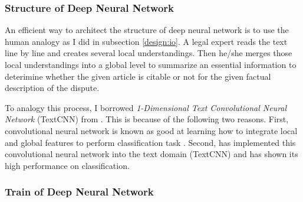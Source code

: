 \documentclass[12pt,letterpaper]{article}
\begin{document}
 

\subsubsection{Structure of Deep Neural Network}

An efficient way to architect the structure of deep neural network is to use the
human analogy as I did in subsection \ref{design:io}.
A legal expert reads the text line by line and creates several local understandings.
Then he/she merges those local understandings into a global level to summarize
an essential information to deterimine whether 
the given article is citable or not for the given factual description of the dispute. 

To analogy this process, I borrowed \textit{1-Dimensional Text Convolutional Neural Network} (TextCNN) from \cite{textcnn}.
This is because of the following two reasons. 
First, convolutional neural network is known as good at learning how to integrate local and global features to perform classification task \citep{554195, 8227460}.
Second, \cite{textcnn} has implemented this convolutional neural network into the text domain (TextCNN) 
and has shown its high performance on classification.


\subsubsection{Train of Deep Neural Network}








\end{document}
